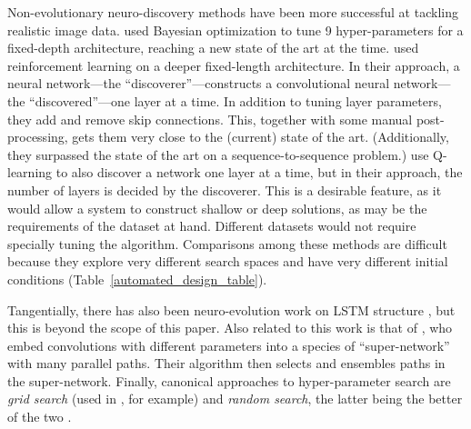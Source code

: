 \documentclass{article}
\renewcommand{\cite}[1]{\citep{#1}}
\newcommand{\citing}[1]{#1}
\begin{document}
Non-evolutionary neuro-discovery methods have been more successful at tackling realistic image data. \citet{snoek2012practical} used Bayesian optimization to tune 9 hyper-parameters for a fixed-depth architecture, reaching a new state of the art at the time. \citet{zoph2016neural} used reinforcement learning on a deeper fixed-length architecture. In their approach, a neural network---the ``discoverer''---constructs a convolutional neural network---the ``discovered''---one layer at a time. In addition to tuning layer parameters, they add and remove skip connections. This, together with some manual post-processing, gets them very close to the (current) state of the art. (Additionally, they surpassed the state of the art on a sequence-to-sequence problem.) \citet{baker2016designing} use Q-learning to also discover a network one layer at a time, but in their approach, the number of layers is decided by the discoverer. This is a desirable feature, as it would allow a system to construct shallow or deep solutions, as may be the requirements of the dataset at hand. Different datasets would not require specially tuning the algorithm. Comparisons among these methods are difficult because they explore very different search spaces and have very different initial conditions (Table~\ref{automated_design_table}).

Tangentially, there has also been neuro-evolution work on LSTM structure \cite{bayer2009evolving, zaremba2015empirical}, but this is beyond the scope of this paper. Also related to this work is that of \citet{saxena2016convolutional}, who embed convolutions with different parameters into a species of ``super-network'' with many parallel paths. Their algorithm then selects and ensembles paths in the super-network. Finally, canonical approaches to hyper-parameter search are {\em grid search} \citing{(used in \citet{zagoruyko2016wide}, for example)} and {\em random search}, the latter being the better of the two \cite{bergstra2012random}.
\end{document}
